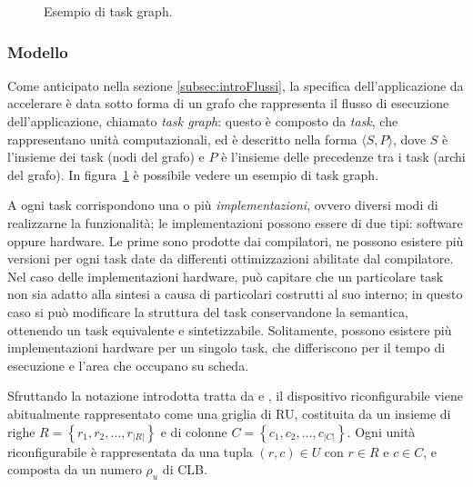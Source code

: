 \begin{figure}[ht]
\begin{center}
\caption{Esempio di task graph.}
\label{fig:taskGraphExample}
\end{center}
\end{figure}

\subsubsection{Modello}
Come anticipato nella sezione \ref{subsec:introFlussi}, la specifica dell'applicazione
da accelerare è data sotto forma di un grafo che
rappresenta il flusso di esecuzione dell'applicazione, chiamato \emph{task
graph}: questo è composto da \emph{task},
che rappresentano unità computazionali, ed \`e descritto nella forma
$\langle S, P \rangle$, dove $S$ è l'insieme dei task (nodi del grafo) e $P$
\`e l'insieme delle precedenze tra i task (archi del grafo).
In figura~\ref{fig:taskGraphExample} è possibile vedere un esempio di
task graph.

A ogni task corrispondono una o più \emph{implementazioni}, ovvero diversi modi di
realizzarne la funzionalità; le implementazioni possono essere di due tipi: software
oppure hardware. Le prime sono prodotte dai compilatori, ne possono
esistere più versioni per ogni task date da differenti ottimizzazioni abilitate dal
compilatore.
Nel caso delle implementazioni hardware, pu\`o capitare che un particolare task non sia adatto
alla sintesi a causa di particolari costrutti al suo interno; in questo caso si pu\`o modificare
la struttura del task conservandone la semantica, ottenendo un task equivalente e sintetizzabile.
Solitamente, possono esistere più implementazioni hardware per un singolo task,
che differiscono per il tempo di esecuzione e l'area che occupano su scheda.

Sfruttando la notazione introdotta tratta da \cite{ModelloRedaelli}
e \cite{ReconfigurableSystemDesignVerification}, il dispositivo riconfigurabile viene abitualmente
rappresentato come una griglia di \ac{RU}, costituita da un insieme di righe
$R=\left\{r_1, r_2, \dots, r_{\vert R \vert}\right\}$ e 
di colonne $C=\left\{c_1, c_2, \dots, c_{\vert C \vert}\right\}$. Ogni unità 
riconfigurabile è rappresentata da una tupla $(r,c) \in U$ con $r \in R$ e $c \in C$, e 
composta da un numero $\rho_{u}$ di \ac{CLB}.

